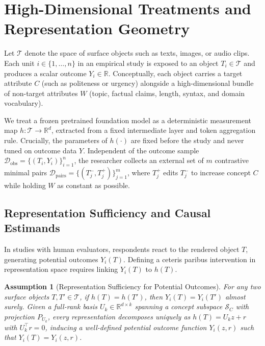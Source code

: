 \documentclass[11pt]{article}
\newtheorem{assumption}{Assumption}
\begin{document}
\section{High-Dimensional Treatments and Representation Geometry}

Let $\mathcal{T}$ denote the space of surface objects such as texts, images, or audio clips. Each unit $i \in \{1, \dots, n\}$ in an empirical study is exposed to an object $T_i \in \mathcal{T}$ and produces a scalar outcome $Y_i \in \mathbb{R}$. Conceptually, each object carries a target attribute $C$ (such as politeness or urgency) alongside a high-dimensional bundle of non-target attributes $W$ (topic, factual claims, length, syntax, and domain vocabulary).

We treat a frozen pretrained foundation model as a deterministic measurement map $h : \mathcal{T} \to \mathbb{R}^d$, extracted from a fixed intermediate layer and token aggregation rule. Crucially, the parameters of $h(\cdot)$ are fixed before the study and never tuned on outcome data $Y$. Independent of the outcome sample $\mathcal{D}_{\mathrm{obs}} = \{(T_i, Y_i)\}_{i=1}^n$, the researcher collects an external set of $m$ contrastive minimal pairs $\mathcal{D}_{\mathrm{pairs}} = \{(T_j^-, T_j^+)\}_{j=1}^m$, where $T_j^+$ edits $T_j^-$ to increase concept $C$ while holding $W$ as constant as possible.

\subsection{Representation Sufficiency and Causal Estimands}

In studies with human evaluators, respondents react to the rendered object $T$, generating potential outcomes $Y_i(T)$. Defining a ceteris paribus intervention in representation space requires linking $Y_i(T)$ to $h(T)$.

\begin{assumption}[Representation Sufficiency for Potential Outcomes]\label{ass:rep_sufficiency}
For any two surface objects $T, T' \in \mathcal{T}$, if $h(T) = h(T')$, then $Y_i(T) = Y_i(T')$ almost surely. Given a full-rank basis $U_k \in \mathbb{R}^{d \times k}$ spanning a concept subspace $\mathcal{S}_C$ with projection $P_{U_k}$, every representation decomposes uniquely as $h(T) = U_k z + r$ with $U_k^\top r = 0$, inducing a well-defined potential outcome function $Y_i(z, r)$ such that $Y_i(T) = Y_i(z, r)$.
\end{assumption}
\end{document}
